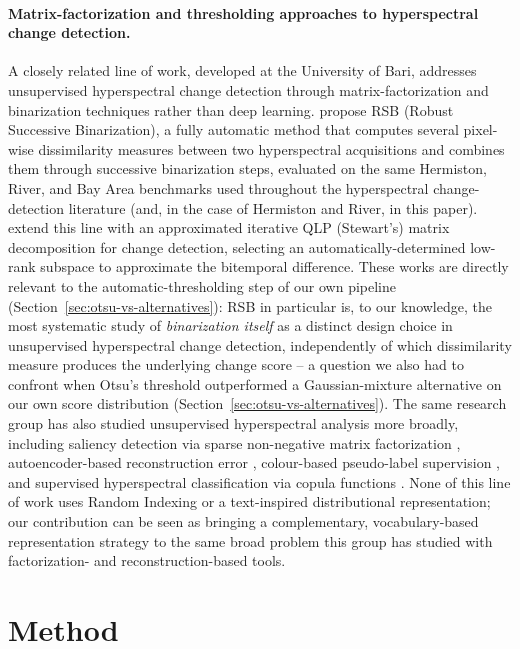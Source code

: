 \documentclass[11pt]{article}
\begin{document}
\paragraph{Matrix-factorization and thresholding approaches to hyperspectral change detection.} A closely related line of work, developed at the University of Bari, addresses unsupervised hyperspectral change detection through matrix-factorization and binarization techniques rather than deep learning. \citet{falini2022rsb} propose RSB (Robust Successive Binarization), a fully automatic method that computes several pixel-wise dissimilarity measures between two hyperspectral acquisitions and combines them through successive binarization steps, evaluated on the same Hermiston, River, and Bay Area benchmarks used throughout the hyperspectral change-detection literature (and, in the case of Hermiston and River, in this paper). \citet{falini2024qlp} extend this line with an approximated iterative QLP (Stewart's) matrix decomposition for change detection, selecting an automatically-determined low-rank subspace to approximate the bitemporal difference. These works are directly relevant to the automatic-thresholding step of our own pipeline (Section~\ref{sec:otsu-vs-alternatives}): RSB in particular is, to our knowledge, the most systematic study of \emph{binarization itself} as a distinct design choice in unsupervised hyperspectral change detection, independently of which dissimilarity measure produces the underlying change score -- a question we also had to confront when Otsu's threshold outperformed a Gaussian-mixture alternative on our own score distribution (Section~\ref{sec:otsu-vs-alternatives}). The same research group has also studied unsupervised hyperspectral analysis more broadly, including saliency detection via sparse non-negative matrix factorization \citep{falini2020eais}, autoencoder-based reconstruction error \citep{appice2020ismis,falini2020lod}, colour-based pseudo-label supervision \citep{appice2021jiis}, and supervised hyperspectral classification via copula functions \citep{tamborrino2022copula}. None of this line of work uses Random Indexing or a text-inspired distributional representation; our contribution can be seen as bringing a complementary, vocabulary-based representation strategy to the same broad problem this group has studied with factorization- and reconstruction-based tools.

\section{Method}
\end{document}
